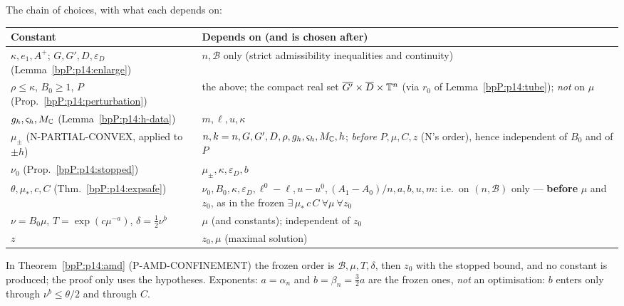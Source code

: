 \begin{remark}\label{bpP:p14:constants}
The chain of choices, with what each depends on:
\begin{center}\small
\begin{tabular}{p{}p{}}
\textbf{Constant} & \textbf{Depends on (and is chosen after)}\\\hline
$\kappa,e_1,A^+$; $G,G',D,\varepsilon_D$ (Lemma~\ref{bpP:p14:enlarge}) & $n,\mathcal B$ only (strict admissibility inequalities and continuity)\\
$\rho\le\kappa$, $B_0\ge1$, $P$ (Prop.~\ref{bpP:p14:perturbation}) & the above; the compact real set $\overline{G'}\times\overline D\times\mathbb{T}^n$ (via $r_0$ of Lemma~\ref{bpP:p14:tube}); \emph{not} on $\mu$\\
$g_h,\varsigma_h,M_{\mathbb{C}}$ (Lemma~\ref{bpP:p14:h-data}) & $m,\ell,u,\kappa$\\
$\mu_\pm$ (N-PARTIAL-CONVEX, applied to $\pm h$) & $n,k=n,G,G',D,\rho,g_h,\varsigma_h,M_{\mathbb{C}},h$; \emph{before} $P,\mu,C,z$ (N's order), hence independent of $B_0$ and of $P$\\
$\nu_0$ (Prop.~\ref{bpP:p14:stopped}) & $\mu_\pm,\kappa,\varepsilon_D,b$\\
$\theta,\mu_*,c,C$ (Thm.~\ref{bpP:p14:expsafe}) & $\nu_0,B_0,\kappa,\varepsilon_D,\ell^0-\ell,u-u^0,(A_1-A_0)/n,a,b,u,m$: i.e.\ on $(n,\mathcal B)$ only --- \textbf{before} $\mu$ and $z_0$, as in the frozen $\exists\,\mu_*\,c\,C\ \forall\mu\ \forall z_0$\\
$\nu=B_0\mu$, $T=\exp(c\mu^{-a})$, $\delta=\frac12\nu^b$ & $\mu$ (and constants); independent of $z_0$\\
$z$ & $z_0,\mu$ (maximal solution)
\end{tabular}
\end{center}
In Theorem~\ref{bpP:p14:amd} (P-AMD-CONFINEMENT) the frozen order is $\mathcal B,\mu,T,\delta$, then $z_0$ with the stopped bound, and no constant is produced; the proof only uses the hypotheses. Exponents: $a=\alpha_n$ and $b=\beta_n=\frac32a$ are the frozen ones, \emph{not} an optimisation: $b$ enters only through $\nu^b\le\theta/2$ and through $C$.
\end{remark}

